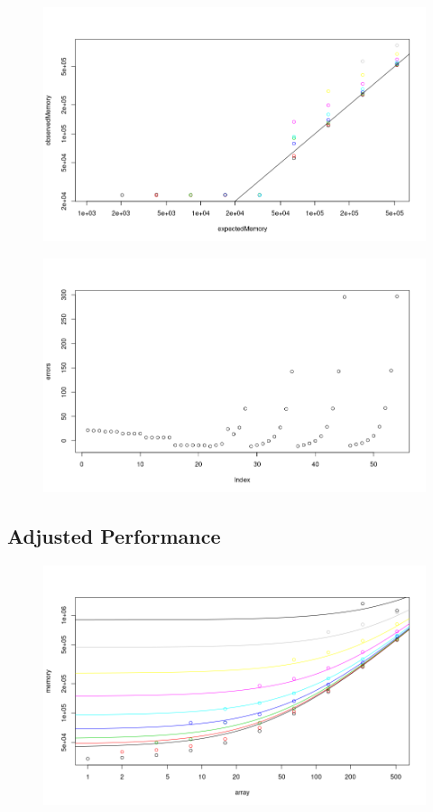 \documentclass{article}
\begin{document}
\begin{figure}
  \centering
  \includegraphics[width=\textwidth]{../proof_of_concept/comparison1.png}
  \caption{}
  \label{}
\end{figure}

\begin{figure}
  \centering
  \includegraphics[width=\textwidth]{../proof_of_concept/comparison2.png}
  \caption{}
  \label{}
\end{figure}

\subsection{Adjusted Performance}

\begin{figure}
  \centering
  \includegraphics[width=\textwidth]{../proof_of_concept/prediction1.png}
  \caption{}
  \label{}
\end{figure}
\end{document}
